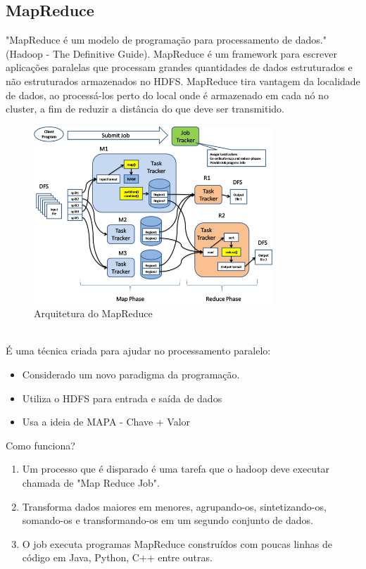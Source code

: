 \documentclass[a4paper,11pt]{article}
\begin{document}
\subsection{MapReduce}
"MapReduce é um modelo de programação para processamento de dados." (Hadoop - The Definitive Guide). MapReduce é um framework para escrever aplicações paralelas que processam grandes quantidades de dados estruturados e não estruturados armazenados no HDFS. MapReduce tira vantagem da localidade de dados, ao processá-los perto do local onde é armazenado em cada nó no cluster, a fim de reduzir a distância do que deve ser transmitido.
\begin{figure}[!htb]
	\centering
	\includegraphics[width=0.8\textwidth]{imgHadoop/mapReduce.png}
	\caption{Arquitetura do MapReduce}
\end{figure} \\
É uma técnica criada para ajudar no processamento paralelo:
\begin{itemize}[noitemsep]
	\item Considerado um novo paradigma da programação.
	\item Utiliza o HDFS para entrada e saída de dados
	\item Usa a ideia de MAPA - Chave + Valor
\end{itemize}
Como funciona?
\begin{enumerate}
	\item Um processo que é disparado é uma tarefa que o hadoop deve executar chamada de "Map Reduce Job".
	\item Transforma dados maiores em menores, agrupando-os, sintetizando-os, somando-os e transformando-os em um segundo conjunto de dados.
	\item O job executa programas MapReduce construídos com poucas linhas de código em Java, Python, C++ entre outras.
\end{enumerate}
\end{document}
